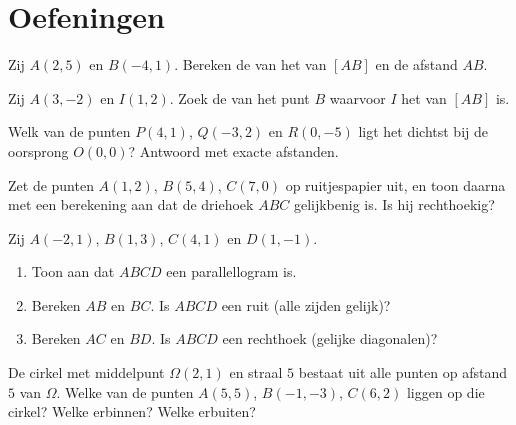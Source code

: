 \section{Oefeningen}

\begin{exercise}[$\star$]\label{exo:g10:coordgeom:1}
Zij $A(2, 5)$ en $B(-4, 1)$. Bereken de  van het  van
$[AB]$ en de afstand $AB$.
\end{exercise}

\begin{exercise}[$\star$]\label{exo:g10:coordgeom:2}
Zij $A(3, -2)$ en $I(1, 2)$. Zoek de  van het punt $B$ waarvoor
$I$ het  van $[AB]$ is.
\end{exercise}

\begin{exercise}[$\star$]\label{exo:g10:coordgeom:3}
Welk van de punten $P(4, 1)$, $Q(-3, 2)$ en $R(0, -5)$ ligt het dichtst bij
de oorsprong $O(0,0)$? Antwoord met exacte afstanden.
\end{exercise}

\begin{exercise}[$\star$]\label{exo:g10:coordgeom:4}
Zet de punten $A(1, 2)$, $B(5, 4)$, $C(7, 0)$ op ruitjespapier uit, en toon
daarna met een berekening aan dat de driehoek $ABC$ gelijkbenig is. Is hij
rechthoekig?
\end{exercise}

\begin{exercise}[$\star\star$]\label{exo:g10:coordgeom:5}
Zij $A(-2, 1)$, $B(1, 3)$, $C(4, 1)$ en $D(1, -1)$.
\begin{enumerate}
  \item Toon aan dat $ABCD$ een parallellogram is.
  \item Bereken $AB$ en $BC$. Is $ABCD$ een ruit (alle zijden gelijk)?
  \item Bereken $AC$ en $BD$. Is $ABCD$ een rechthoek (gelijke diagonalen)?
\end{enumerate}
\end{exercise}

\begin{exercise}[$\star\star$]\label{exo:g10:coordgeom:6}
De cirkel met middelpunt $\Omega(2, 1)$ en straal $5$ bestaat uit alle
punten op afstand $5$ van $\Omega$. Welke van de punten $A(5, 5)$,
$B(-1, -3)$, $C(6, 2)$ liggen op die cirkel? Welke erbinnen? Welke
erbuiten?
\end{exercise}

